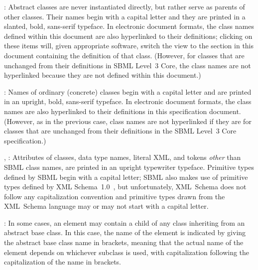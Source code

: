 \documentclass[draftspec]{sbmlpkgspec}
\begin{document}
\begin{description}
  
\item {}: Abstract classes are never
  instantiated directly, but rather serve as parents of other classes.
  Their names begin with a capital letter and they are printed in a
  slanted, bold, sans-serif typeface.  In electronic document formats,
  the class names defined within this document are also hyperlinked to
  their definitions; clicking on these items will, given appropriate
  software, switch the view to the section in this document containing
  the definition of that class.  (However, for classes that are
  unchanged from their definitions in SBML Level~3 Core, the class names
  are not hyperlinked because they are not defined within this
  document.)
  
\item {}: Names of ordinary (concrete) classes begin with a
  capital letter and are printed in an upright, bold, sans-serif
  typeface.  In electronic document formats, the class names are also
  hyperlinked to their definitions in this specification document.
  (However, as in the previous case, class names are not hyperlinked if
  they are for classes that are unchanged from their definitions in the
  SBML Level~3 Core specification.)

\item {}, : Attributes of classes, data
  type names, literal XML, and tokens \emph{other} than SBML class
  names, are printed in an upright typewriter typeface.  Primitive types
  defined by SBML begin with a capital letter; SBML also makes use of
  primitive types defined by XML
  Schema~1.0~\citep{biron:2000,fallside:2000,thompson:2000}, but
  unfortunately, XML~Schema does not follow any capitalization
  convention and primitive types drawn from the XML~Schema language may
  or may not start with a capital letter.

\item \token{[elementName]}:  In some cases, an element may contain a child of any class inheriting from an abstract base class.  In this case, the name of the element is indicated by giving the abstract base class name in brackets, meaning that the actual name of the element depends on whichever subclass is used, with capitalization following the capitalization of the name in brackets.

\end{description}
\end{document}
